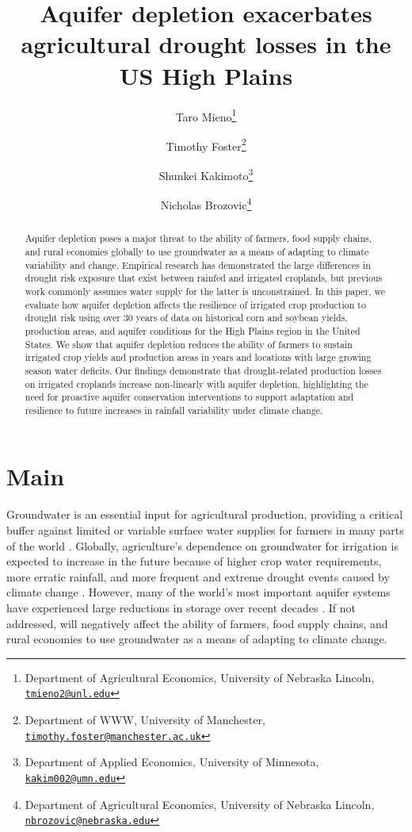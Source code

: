 \documentclass[
]{article}
\title{Aquifer depletion exacerbates agricultural drought losses in the US High Plains}
\author{Taro Mieno\footnote{Department of Agricultural Economics, University of Nebraska Lincoln, \href{mailto:tmieno2@unl.edu}{\nolinkurl{tmieno2@unl.edu}}} \and Timothy Foster\footnote{Department of WWW, University of Manchester, \href{mailto:timothy.foster@manchester.ac.uk}{\nolinkurl{timothy.foster@manchester.ac.uk}}} \and Shunkei Kakimoto\footnote{Department of Applied Economics, University of Minnesota, \href{mailto:kakim002@umn.edu}{\nolinkurl{kakim002@umn.edu}}} \and Nicholas Brozovic\footnote{Department of Agricultural Economics, University of Nebraska Lincoln, \href{mailto:nbrozovic@nebraska.edu}{\nolinkurl{nbrozovic@nebraska.edu}}}}
\date{}
\begin{document}
\maketitle
\begin{abstract}
Aquifer depletion poses a major threat to the ability of farmers, food supply chains, and rural economies globally to use groundwater as a means of adapting to climate variability and change. Empirical research has demonstrated the large differences in drought risk exposure that exist between rainfed and irrigated croplands, but previous work commonly assumes water supply for the latter is unconstrained. In this paper, we evaluate how aquifer depletion affects the resilience of irrigated crop production to drought risk using over 30 years of data on historical corn and soybean yields, production areas, and aquifer conditions for the High Plains region in the United States. We show that aquifer depletion reduces the ability of farmers to sustain irrigated crop yields and production areas in years and locations with large growing season water deficits. Our findings demonstrate that drought-related production losses on irrigated croplands increase non-linearly with aquifer depletion, highlighting the need for proactive aquifer conservation interventions to support adaptation and resilience to future increases in rainfall variability under climate change.
\end{abstract}

\hypertarget{main}{%
\section{Main}\label{main}}

Groundwater is an essential input for agricultural production, providing a critical buffer against limited or variable surface water supplies for farmers in many parts of the world \citep{scanlon2023global}. Globally, agriculture's dependence on groundwater for irrigation is expected to increase in the future because of higher crop water requirements, more erratic rainfall, and more frequent and extreme drought events caused by climate change \citep{zhou2010impact, wada2013multimodel, wada2014sustainability, kreins2015quantification, florke2018water}. However, many of the world's most important aquifer systems have experienced large reductions in storage over recent decades \citep{wada2010global, famiglietti2011satellites, scanlon2012groundwater, konikow2015long, bierkens2019non}. If not addressed, will negatively affect the ability of farmers, food supply chains, and rural economies to use groundwater as a means of adapting to climate change.
\end{document}
